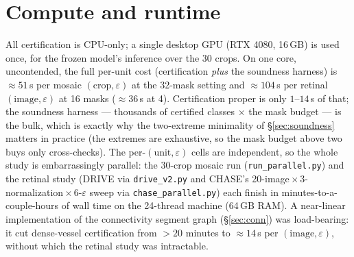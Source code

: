 \documentclass[10pt]{article}
\newcommand{\eps}{\varepsilon}
\begin{document}
\section{Compute and runtime}\label{app:compute}
All certification is CPU-only; a single desktop GPU (RTX 4080, 16\,GB) is
used once, for the frozen model's inference over the 30 crops. On one core,
uncontended, the full per-unit cost (certification \emph{plus} the soundness
harness) is ${\approx}51$\,s per mosaic $(\text{crop}, \eps)$ at the 32-mask
setting and ${\approx}104$\,s per retinal $(\text{image}, \eps)$ at 16 masks
(${\approx}36$\,s at 4). Certification proper is only $1$--$14$\,s of that;
the soundness harness --- thousands of certified classes $\times$ the mask
budget --- is the bulk, which is exactly why the two-extreme minimality of
\S\ref{sec:soundness} matters in practice (the extremes are exhaustive, so
the mask budget above two buys only cross-checks). The per-$(\text{unit},
\eps)$ cells are independent, so the whole study is embarrassingly parallel:
the 30-crop mosaic run (\texttt{run\_parallel.py}) and the retinal study
(DRIVE via \texttt{drive\_v2.py} and CHASE's
20-image\,$\times$\,3-normalization\,$\times$\,6-$\eps$ sweep via
\texttt{chase\_parallel.py}) each finish in minutes-to-a-couple-hours of
wall time on the 24-thread machine (64\,GB RAM). A near-linear
implementation of the connectivity segment graph (\S\ref{sec:conn})
was load-bearing: it cut dense-vessel certification from ${>}20$ minutes to
${\approx}14$\,s per $(\text{image}, \eps)$, without which the retinal study
was intractable.
\end{document}
